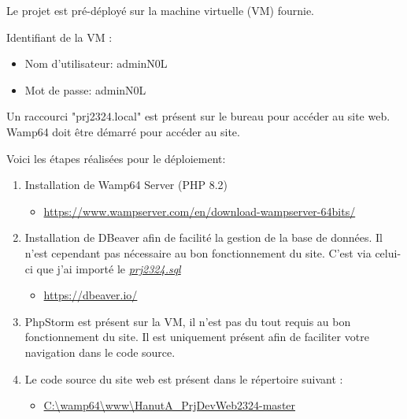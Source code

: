 Le projet est pré-déployé sur la machine virtuelle (VM) fournie. 

Identifiant de la VM : 
\begin{itemize}[label=$\bullet$]
	\item Nom d'utilisateur: adminN0L
	\item Mot de passe: adminN0L
\end{itemize}

Un raccourci "prj2324.local" est présent sur le bureau pour accéder au site web. Wamp64 doit être démarré pour accéder au site.

Voici les étapes réalisées pour le déploiement:

\begin{enumerate}
	\item Installation de Wamp64 Server (PHP 8.2)
	\begin{itemize}[label=$\bullet$]
		\item \url{https://www.wampserver.com/en/download-wampserver-64bits/}
	\end{itemize}
	
	\item Installation de DBeaver afin de facilité la gestion de la base de données. Il n'est cependant pas nécessaire au bon fonctionnement du site. C'est via celui-ci que j'ai importé le \textit{\url{prj2324.sql}}
	\begin{itemize}[label=$\bullet$]
		\item \url{https://dbeaver.io/}
	\end{itemize}
	
	\item PhpStorm est présent sur la VM, il n'est pas du tout requis au bon fonctionnement du site. Il est uniquement présent afin de faciliter votre navigation dans le code source.

	\item Le code source du site web est présent dans le répertoire suivant :
	\begin{itemize}[label=$\bullet$]
		\item \url{C:\wamp64\www\HanutA\_PrjDevWeb2324-master}
	\end{itemize}
		

\end{enumerate}
